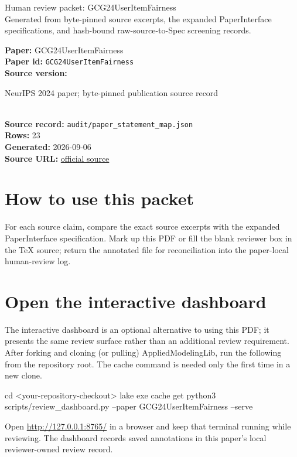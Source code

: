 \documentclass[10pt]{article}
\begin{document}
\fontsize{9}{10}\selectfont

\begin{center}
{\LARGE Human review packet: GCG24UserItemFairness}\\[0.35em]
\small Generated from byte-pinned source excerpts, the expanded PaperInterface
specifications, and hash-bound raw-source-to-Spec screening records.
\end{center}

\noindent\textbf{Paper:} GCG24UserItemFairness\\
\textbf{Paper id:} \texttt{GCG24UserItemFairness}\\
\textbf{Source version:} \parbox[t]{0.76\linewidth}{\raggedright NeurIPS 2024 paper; byte-pinned publication source record}\\
\textbf{Source record:} \texttt{audit/paper\_statement\_map.json}\\
\textbf{Rows:} 23\\
\textbf{Generated:} 2026-09-06\\
\textbf{Source URL:} \href{https://openreview.net/pdf?id=ZOZjMs3JTs}{official source}





\section*{How to use this packet}
For each source claim, compare the exact source excerpts with the expanded
PaperInterface specification. Mark up this PDF or fill the blank reviewer box in the TeX source;
return the annotated file for reconciliation into the paper-local human-review
log.

\section*{Open the interactive dashboard}
The interactive dashboard is an optional alternative to using this PDF; it
presents the same review surface rather than an additional review requirement.
After forking and cloning (or pulling) AppliedModelingLib, run the following from the
repository root. The cache command is needed only the first time in a new clone.
\begin{ReviewVerbatim}
cd <your-repository-checkout>
lake exe cache get
python3 scripts/review_dashboard.py --paper GCG24UserItemFairness --serve
\end{ReviewVerbatim}
Open \url{http://127.0.0.1:8765/} in a browser and keep that terminal running
while reviewing. The dashboard records saved annotations in this paper's local
reviewer-owned review record.
\end{document}
